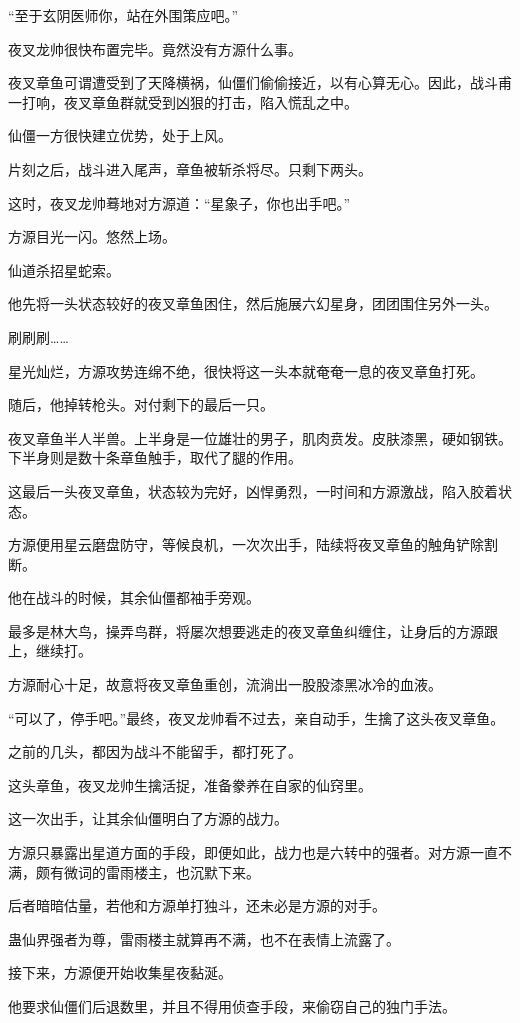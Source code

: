 \begin{this_body}
“至于玄阴医师你，站在外围策应吧。”

夜叉龙帅很快布置完毕。竟然没有方源什么事。

夜叉章鱼可谓遭受到了天降横祸，仙僵们偷偷接近，以有心算无心。因此，战斗甫一打响，夜叉章鱼群就受到凶狠的打击，陷入慌乱之中。

仙僵一方很快建立优势，处于上风。

片刻之后，战斗进入尾声，章鱼被斩杀将尽。只剩下两头。

这时，夜叉龙帅蓦地对方源道：“星象子，你也出手吧。”

方源目光一闪。悠然上场。

仙道杀招星蛇索。

他先将一头状态较好的夜叉章鱼困住，然后施展六幻星身，团团围住另外一头。

刷刷刷……

星光灿烂，方源攻势连绵不绝，很快将这一头本就奄奄一息的夜叉章鱼打死。

随后，他掉转枪头。对付剩下的最后一只。

夜叉章鱼半人半兽。上半身是一位雄壮的男子，肌肉贲发。皮肤漆黑，硬如钢铁。下半身则是数十条章鱼触手，取代了腿的作用。

这最后一头夜叉章鱼，状态较为完好，凶悍勇烈，一时间和方源激战，陷入胶着状态。

方源便用星云磨盘防守，等候良机，一次次出手，陆续将夜叉章鱼的触角铲除割断。

他在战斗的时候，其余仙僵都袖手旁观。

最多是林大鸟，操弄鸟群，将屡次想要逃走的夜叉章鱼纠缠住，让身后的方源跟上，继续打。

方源耐心十足，故意将夜叉章鱼重创，流淌出一股股漆黑冰冷的血液。

“可以了，停手吧。”最终，夜叉龙帅看不过去，亲自动手，生擒了这头夜叉章鱼。

之前的几头，都因为战斗不能留手，都打死了。

这头章鱼，夜叉龙帅生擒活捉，准备豢养在自家的仙窍里。

这一次出手，让其余仙僵明白了方源的战力。

方源只暴露出星道方面的手段，即便如此，战力也是六转中的强者。对方源一直不满，颇有微词的雷雨楼主，也沉默下来。

后者暗暗估量，若他和方源单打独斗，还未必是方源的对手。

蛊仙界强者为尊，雷雨楼主就算再不满，也不在表情上流露了。

接下来，方源便开始收集星夜黏涎。

他要求仙僵们后退数里，并且不得用侦查手段，来偷窃自己的独门手法。


\end{this_body}
